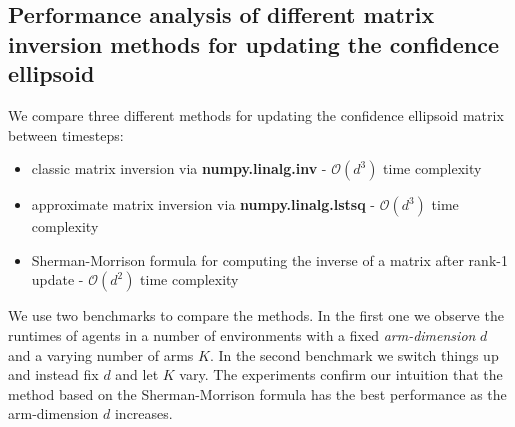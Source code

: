 \subsection{Performance analysis of different matrix inversion methods for updating the confidence ellipsoid}
We compare three different methods for updating the confidence ellipsoid matrix between timesteps:
\begin{itemize}
  \item classic matrix inversion via \textbf{numpy.linalg.inv} - $\mathcal{O}(d^3)$ time complexity
  \item approximate matrix inversion via \textbf{numpy.linalg.lstsq} - $\mathcal{O}(d^3)$ time complexity
  \item Sherman-Morrison formula for computing the inverse of a matrix after rank-1 update - $\mathcal{O}(d^2)$ time complexity
\end{itemize}
We use two benchmarks to compare the methods. In the first one we observe the runtimes of agents in a number of environments
with a fixed \textit{arm-dimension} $d$ and a varying number of arms $K$. In the second benchmark we switch things up and instead fix $d$
and let $K$ vary. The experiments confirm our intuition that the method based on the Sherman-Morrison formula has the best performance as the
arm-dimension $d$ increases.


